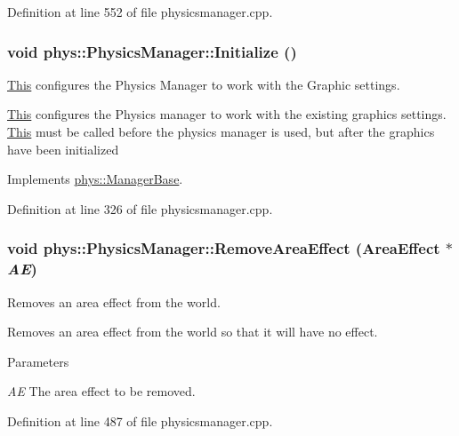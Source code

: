 Definition at line 552 of file physicsmanager.cpp.

\hypertarget{classphys_1_1PhysicsManager_a28885be750bb763d957f122593815388}{
\subsubsection[{Initialize}]{\setlength{\rightskip}{0pt plus 5cm}void phys::PhysicsManager::Initialize ()}}
\label{d3/dcc/classphys_1_1PhysicsManager_a28885be750bb763d957f122593815388}


\hyperlink{structThis}{This} configures the Physics Manager to work with the Graphic settings. 

\hyperlink{structThis}{This} configures the Physics manager to work with the existing graphics settings. \hyperlink{structThis}{This} must be called before the physics manager is used, but after the graphics have been initialized 

Implements \hyperlink{classphys_1_1ManagerBase_a57dd8e54e767427d5bdcc86dc66d73ed}{phys::ManagerBase}.



Definition at line 326 of file physicsmanager.cpp.

\hypertarget{classphys_1_1PhysicsManager_a5ee0f784a8239be56164a7a67a28f227}{
\subsubsection[{RemoveAreaEffect}]{\setlength{\rightskip}{0pt plus 5cm}void phys::PhysicsManager::RemoveAreaEffect ({\bf AreaEffect} $\ast$ {\em AE})}}
\label{d3/dcc/classphys_1_1PhysicsManager_a5ee0f784a8239be56164a7a67a28f227}


Removes an area effect from the world. 

Removes an area effect from the world so that it will have no effect. 
\begin{DoxyParams}{Parameters}
\item[{\em AE}]The area effect to be removed. \end{DoxyParams}


Definition at line 487 of file physicsmanager.cpp.

